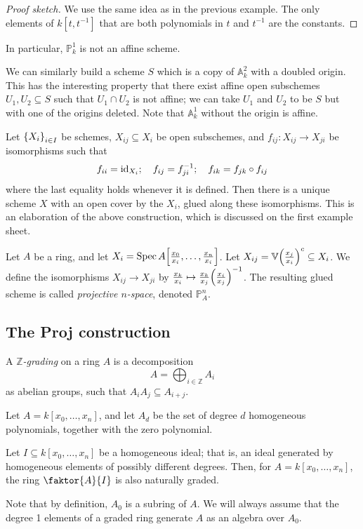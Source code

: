 \begin{proof}[Proof sketch]
    We use the same idea as in the previous example.
    The only elements of \( k[t, t^{-1}] \) that are both polynomials in \( t \) and \( t^{-1} \) are the constants.
\end{proof}
In particular, \( \mathbb P^1_k \) is not an affine scheme.
\begin{example}
    We can similarly build a scheme \( S \) which is a copy of \( \mathbb A^2_k \) with a doubled origin.
    This has the interesting property that there exist affine open subschemes \( U_1, U_2 \subseteq S \) such that \( U_1 \cap U_2 \) is not affine; we can take \( U_1 \) and \( U_2 \) to be \( S \) but with one of the origins deleted.
    Note that \( \mathbb A^1_k \) without the origin is affine.
\end{example}

Let \( \qty{X_i}_{i \in I} \) be schemes, \( X_{ij} \subseteq X_i \) be open subschemes, and \( f_{ij} : X_{ij} \to X_{ji} \) be isomorphisms such that
\[ f_{ii} = \operatorname{id}_{X_i};\quad f_{ij} = f_{ji}^{-1};\quad f_{ik} = f_{jk} \circ f_{ij} \]
where the last equality holds whenever it is defined.
Then there is a unique scheme \( X \) with an open cover by the \( X_i \), glued along these isomorphisms.
This is an elaboration of the above construction, which is discussed on the first example sheet.

Let \( A \) be a ring, and let \( X_i = \operatorname{Spec} A\qty[\frac{x_0}{x_i}, \dots, \frac{x_n}{x_i}] \).
Let \( X_{ij} = \mathbb V\qty(\frac{x_j}{x_i})^c \subseteq X_i \).
We define the isomorphisms \( X_{ij} \to X_{ji} \) by \( \frac{x_k}{x_i} \mapsto \frac{x_k}{x_j} \qty(\frac{x_i}{x_j})^{-1} \).
The resulting glued scheme is called \emph{projective \( n \)-space}, denoted \( \mathbb P^n_A \).

\subsection{The Proj construction}
\begin{definition}
    A \emph{\( \mathbb Z \)-grading} on a ring \( A \) is a decomposition
    \[ A = \bigoplus_{i \in \mathbb Z} A_i \]
    as abelian groups, such that \( A_i A_j \subseteq A_{i+j} \).
\end{definition}
\begin{example}
    Let \( A = k[x_0, \dots, x_n] \), and let \( A_d \) be the set of degree \( d \) homogeneous polynomials, together with the zero polynomial.
\end{example}
\begin{example}
    Let \( I \subseteq k[x_0, \dots, x_n] \) be a homogeneous ideal; that is, an ideal generated by homogeneous elements of possibly different degrees.
    Then, for \( A = k[x_0, \dots, x_n] \), the ring \( \faktor{A}{I} \) is also naturally graded.
\end{example}
Note that by definition, \( A_0 \) is a subring of \( A \).
We will always assume that the degree 1 elements of a graded ring generate \( A \) as an algebra over \( A_0 \).
